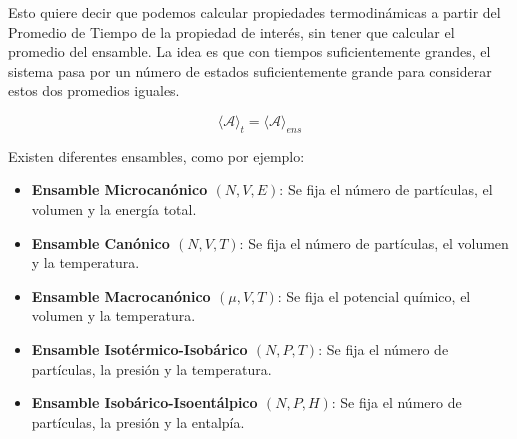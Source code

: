 
Esto quiere decir que podemos calcular propiedades termodinámicas a partir del Promedio de Tiempo de la propiedad de interés, sin tener que calcular el promedio del ensamble. La idea es que con tiempos suficientemente grandes, el sistema pasa por un número de estados suficientemente grande para considerar estos dos promedios iguales.

\begin{equation}
\langle \mathbf{\mathcal{A}} \rangle _{t} = \langle \mathbf{\mathcal{A}} \rangle _{ens}
\end{equation}

Existen diferentes ensambles, como por ejemplo:

\begin{itemize}
	\item \textbf{Ensamble Microcanónico $(N,V,E)$}: Se fija el número de partículas, el volumen y la energía total.
	\item \textbf{Ensamble Canónico $(N,V,T)$}: Se fija el número de partículas, el volumen y la temperatura.
	\item \textbf{Ensamble Macrocanónico $(\mu,V,T)$}: Se fija el potencial químico, el volumen y la temperatura.
	\item \textbf{Ensamble Isotérmico-Isobárico $(N,P,T)$}: Se fija el número de partículas, la presión y la temperatura.
	\item \textbf{Ensamble Isobárico-Isoentálpico $(N,P,H)$}: Se fija el número de partículas, la presión y la entalpía.
\end{itemize}

